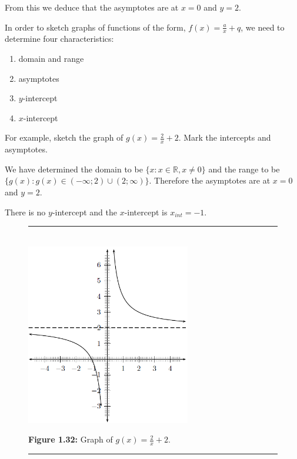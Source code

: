 \label{m39341*id248820}From this we deduce that the asymptotes are at $x=0$ and $y=2$.\par 
\label{m39341*uid157}
\nopagebreak
\label{m39341*id248894}In order to sketch graphs of functions of the form, $f\left(x\right)=\frac{a}{x}+q$, we need to determine four characteristics:\par 
\label{m39341*id248931}\begin{enumerate}[noitemsep, label=\textbf{\arabic*}. ] 
\label{m39341*uid158}\item domain and range
\label{m39341*uid159}\item asymptotes
\label{m39341*uid160}\item $y$-intercept
\label{m39341*uid161}\item $x$-intercept
\end{enumerate}
\label{m39341*id248998}For example, sketch the graph of $g\left(x\right)=\frac{2}{x}+2$. Mark the intercepts and asymptotes.\par 
\label{m39341*id249035}We have determined the domain to be $\{x:x\in \mathbb{R},x\ne 0\}$ and the range to be $\{g\left(x\right):g\left(x\right)\in \left(-\infty ;2\right)\cup \left(2;\infty \right)\}$. Therefore the asymptotes are at $x=0$ and $y=2$.\par 
\label{m39341*id249164}There is no $y$-intercept and the $x$-intercept is ${x}_{int}=-1$.\par 
\setcounter{subfigure}{0}
\begin{figure}[H] %
\begin{center}
\rule[.1in]{\figurerulewidth}{.005in} \\
\label{m39341*uid162!!!underscore!!!media}\label{m39341*uid162!!!underscore!!!printimage}\includegraphics[height=300px]{col11306.imgs/m39341_MG10C11_026.png} %
\vspace{2pt}
\vspace{\rubberspace}\par \begin{cnxcaption}
\small \textbf{Figure 1.32: }Graph of $g\left(x\right)=\frac{2}{x}+2$.
\end{cnxcaption}
\vspace{.1in}
\rule[.1in]{\figurerulewidth}{.005in} \\
\end{center}
\end{figure}       
